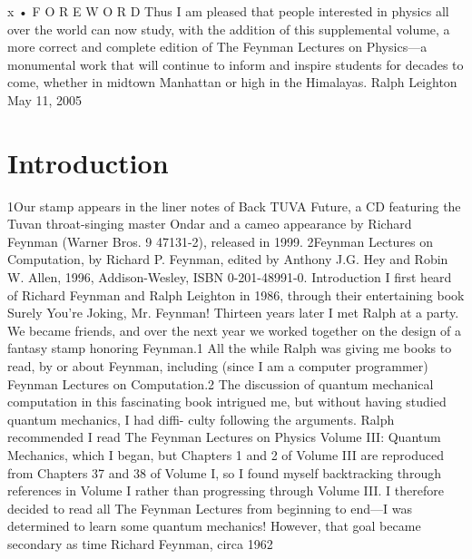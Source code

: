 \documentclass[10pt,oneside]{article}
\begin{document}
x • F O R E W O R D Thus I am pleased that people interested in physics all over the world can now study, with the addition of this supplemental volume, a more correct and complete edition of The Feynman Lectures on Physics---a monumental work that will continue to inform and inspire students for decades to come, whether in midtown Manhattan or high in the Himalayas. Ralph Leighton May 11, 2005\par

\clearpage
{}
\section*{Introduction}
\label{tips-sec-3-introduction}
1Our stamp appears in the liner notes of Back TUVA Future, a CD featuring the Tuvan throat-singing master Ondar and a cameo appearance by Richard Feynman (Warner Bros. 9 47131-2), released in 1999. 2Feynman Lectures on Computation, by Richard P. Feynman, edited by Anthony J.G. Hey and Robin W. Allen, 1996, Addison-Wesley, ISBN 0-201-48991-0. Introduction I first heard of Richard Feynman and Ralph Leighton in 1986, through their entertaining book Surely You’re Joking, Mr. Feynman! Thirteen years later I met Ralph at a party. We became friends, and over the next year we worked together on the design of a fantasy stamp honoring Feynman.1 All the while Ralph was giving me books to read, by or about Feynman, including (since I am a computer programmer) Feynman Lectures on Computation.2 The discussion of quantum mechanical computation in this fascinating book intrigued me, but without having studied quantum mechanics, I had diffi- culty following the arguments. Ralph recommended I read The Feynman Lectures on Physics Volume III: Quantum Mechanics, which I began, but Chapters 1 and 2 of Volume III are reproduced from Chapters 37 and 38 of Volume I, so I found myself backtracking through references in Volume I rather than progressing through Volume III. I therefore decided to read all The Feynman Lectures from beginning to end---I was determined to learn some quantum mechanics! However, that goal became secondary as time Richard Feynman, circa 1962\par
\end{document}
